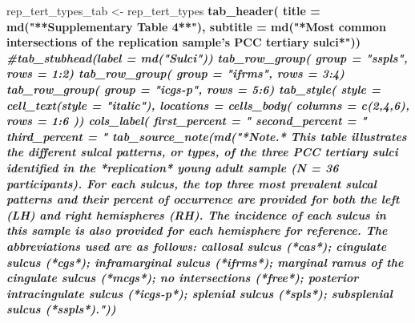 \documentclass[
]{article}
\newenvironment{Shaded}{\begin{snugshade}}{\end{snugshade}}
\newcommand{\CommentTok}[1]{\textcolor[rgb]{0.56,0.35,0.01}{\textit{#1}}}
\newcommand{\DataTypeTok}[1]{\textcolor[rgb]{0.13,0.29,0.53}{#1}}
\newcommand{\DecValTok}[1]{\textcolor[rgb]{0.00,0.00,0.81}{#1}}
\newcommand{\KeywordTok}[1]{\textcolor[rgb]{0.13,0.29,0.53}{\textbf{#1}}}
\newcommand{\NormalTok}[1]{#1}
\newcommand{\OperatorTok}[1]{\textcolor[rgb]{0.81,0.36,0.00}{\textbf{#1}}}
\newcommand{\StringTok}[1]{\textcolor[rgb]{0.31,0.60,0.02}{#1}}
\begin{document}
\begin{Shaded}
\begin{Highlighting}[]
\NormalTok{rep_tert_types_tab <-}\StringTok{ }\NormalTok{rep_tert_types }\OperatorTok{%>%}\StringTok{ }\KeywordTok{gt}\NormalTok{() }\OperatorTok{%>%}
\KeywordTok{tab_header}\NormalTok{(}
  \DataTypeTok{title =} \KeywordTok{md}\NormalTok{(}\StringTok{"**Supplementary Table 4**"}\NormalTok{),}
  \DataTypeTok{subtitle =} \KeywordTok{md}\NormalTok{(}\StringTok{"*Most common intersections of the replication sample's PCC tertiary sulci*"}\NormalTok{)) }\OperatorTok{%>%}
\CommentTok{#tab_stubhead(label = md("Sulci")) %>%}
\KeywordTok{tab_row_group}\NormalTok{(}
    \DataTypeTok{group =} \StringTok{"sspls"}\NormalTok{,}
    \DataTypeTok{rows =} \DecValTok{1}\OperatorTok{:}\DecValTok{2}\NormalTok{) }\OperatorTok{%>%}
\KeywordTok{tab_row_group}\NormalTok{(}
    \DataTypeTok{group =} \StringTok{"ifrms"}\NormalTok{,}
    \DataTypeTok{rows =} \DecValTok{3}\OperatorTok{:}\DecValTok{4}\NormalTok{) }\OperatorTok{%>%}
\KeywordTok{tab_row_group}\NormalTok{(}
    \DataTypeTok{group =} \StringTok{"icgs-p"}\NormalTok{,}
    \DataTypeTok{rows =} \DecValTok{5}\OperatorTok{:}\DecValTok{6}\NormalTok{) }\OperatorTok{%>%}
\KeywordTok{tab_style}\NormalTok{(}
    \DataTypeTok{style =} \KeywordTok{cell_text}\NormalTok{(}\DataTypeTok{style =} \StringTok{"italic"}\NormalTok{),}
    \DataTypeTok{locations =} \KeywordTok{cells_body}\NormalTok{(}
      \DataTypeTok{columns =} \KeywordTok{c}\NormalTok{(}\DecValTok{2}\NormalTok{,}\DecValTok{4}\NormalTok{,}\DecValTok{6}\NormalTok{),}
      \DataTypeTok{rows =} \DecValTok{1}\OperatorTok{:}\DecValTok{6}
\NormalTok{    )) }\OperatorTok{%>%}
\KeywordTok{cols_label}\NormalTok{(}
    \DataTypeTok{first_percent =} \StringTok{"%"}\NormalTok{,}
    \DataTypeTok{second_percent =} \StringTok{"%"}\NormalTok{,}
    \DataTypeTok{third_percent =} \StringTok{"%"}\NormalTok{) }\OperatorTok{%>%}
\KeywordTok{tab_source_note}\NormalTok{(}\KeywordTok{md}\NormalTok{(}\StringTok{"*Note.* This table illustrates the different sulcal patterns, or types, of the three PCC tertiary sulci identified in the *replication* young adult sample (N = 36 participants). For each sulcus, the top three most prevalent sulcal patterns and their percent of occurrence are provided for both the left (LH) and right hemispheres (RH). The incidence of each sulcus in this sample is also provided for each hemisphere for reference. The abbreviations used are as follows: callosal sulcus (*cas*); cingulate sulcus (*cgs*); inframarginal sulcus (*ifrms*); marginal ramus of the cingulate sulcus (*mcgs*); no intersections (*free*); posterior intracingulate sulcus (*icgs-p*); splenial sulcus (*spls*); subsplenial sulcus (*sspls*)."}\NormalTok{)) }\OperatorTok{%>%}
}}}}}}}}}}}
\end{Highlighting}
\end{Shaded}
\end{document}
